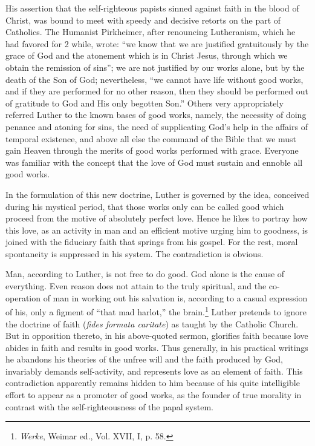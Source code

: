 His assertion that the self-righteous papists sinned against faith in
the blood of Christ, was bound to meet with speedy and decisive retorts
on the part of Catholics. The Humanist Pirkheimer, after renouncing
Lutheranism, which he had favored for 2 while, wrote: “we know that we
are justified gratuitously by the grace of God and the atonement which is
in Christ Jesus, through which we obtain the remission of sins”; we are
not justified by our works alone, but by the death of the Son of God;
nevertheless, “we cannot have life without good works, and if they are
performed for no other reason, then they should be performed out of gratitude
to God and His only begotten Son.” Others very appropriately referred
Luther to the known bases of good works, namely, the necessity of doing
penance and atoning for sins, the need of supplicating God’s help in the
affairs of temporal existence, and above all else the command of the Bible
that we must gain Heaven through the merits of good works performed
with grace. Everyone was familiar with the concept that the love of God
must sustain and ennoble all good works.

In the formulation of this new doctrine, Luther is governed by the
idea, conceived during his mystical period, that those works only can
be called good which proceed from the motive of absolutely perfect
love. Hence he likes to portray how this love, as an activity in man
and an efficient motive urging him to goodness, is joined with the
fiduciary faith that springs from his gospel. For the rest, moral spontaneity
is suppressed in his system. The contradiction is obvious.

Man, according to Luther, is not free to do good. God alone is the cause
of everything. Even reason does not attain to the truly spiritual, and the
co-operation of man in working out his salvation is, according to a casual expression
of his, only a figment of ``that mad harlot,'' the brain.\footnote
{\textit{Werke}, Weimar ed., Vol. XVII, I, p. 58.}
Luther pretends to ignore the doctrine of faith (\textit{fides formata caritate})
as taught by the Catholic Church. But in opposition thereto, in his above-quoted
sermon, glorifies faith because love abides in faith and results
in good works. Thus generally, in his practical writings he abandons his
theories of the unfree will and the faith produced by God, invariably
demands self-activity, and represents love as an element of faith. This contradiction apparently remains hidden to him because of his quite intelligible
effort to appear as a promoter of good works, as the founder of true morality in contrast with the self-righteousness of the papal system.

